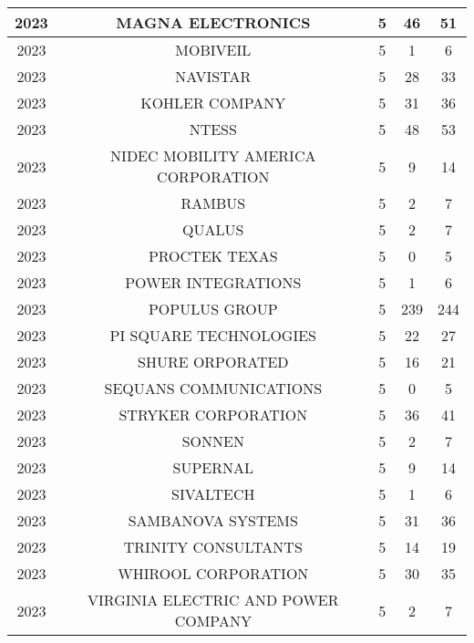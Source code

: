 \documentclass{article}%
\begin{document}
\begin{longtable}{c|c|c|c|c}
\hline%
2023&MAGNA ELECTRONICS&5&46&51\\%
\hline%
2023&MOBIVEIL&5&1&6\\%
\hline%
2023&NAVISTAR&5&28&33\\%
\hline%
2023&KOHLER COMPANY&5&31&36\\%
\hline%
2023&NTESS&5&48&53\\%
\hline%
2023&NIDEC MOBILITY AMERICA CORPORATION&5&9&14\\%
\hline%
2023&RAMBUS&5&2&7\\%
\hline%
2023&QUALUS&5&2&7\\%
\hline%
2023&PROCTEK TEXAS&5&0&5\\%
\hline%
2023&POWER INTEGRATIONS&5&1&6\\%
\hline%
2023&POPULUS GROUP&5&239&244\\%
\hline%
2023&PI SQUARE TECHNOLOGIES&5&22&27\\%
\hline%
2023&SHURE ORPORATED&5&16&21\\%
\hline%
2023&SEQUANS COMMUNICATIONS&5&0&5\\%
\hline%
2023&STRYKER CORPORATION&5&36&41\\%
\hline%
2023&SONNEN&5&2&7\\%
\hline%
2023&SUPERNAL&5&9&14\\%
\hline%
2023&SIVALTECH&5&1&6\\%
\hline%
2023&SAMBANOVA SYSTEMS&5&31&36\\%
\hline%
2023&TRINITY CONSULTANTS&5&14&19\\%
\hline%
2023&WHIROOL CORPORATION&5&30&35\\%
\hline%
2023&VIRGINIA ELECTRIC AND POWER COMPANY&5&2&7\\%
\hline%
\end{longtable}

%
\end{document}
